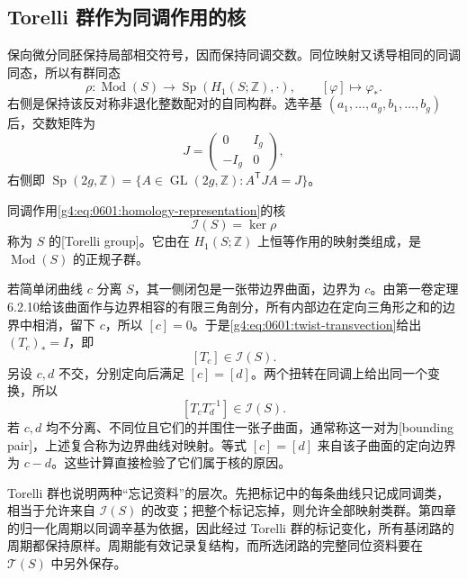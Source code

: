 \subsection{Torelli 群作为同调作用的核}
\label{g4:subsec:0601:06}

保向微分同胚保持局部相交符号，因而保持同调交数。同位映射又诱导相同的同调同态，所以有群同态
\begin{equation}\label{g4:eq:0601:homology-representation}
	\rho:\operatorname{Mod}(S)\longrightarrow
	\operatorname{Sp}(H_1(S;\mathbb Z),\cdot),
	\qquad [\varphi]\longmapsto\varphi_*.
\end{equation}
右侧是保持该反对称非退化整数配对的自同构群。选辛基 \((a_1,\ldots,a_g,b_1,\ldots,b_g)\) 后，交数矩阵为
\[
	J=\begin{pmatrix}0&I_g\\-I_g&0\end{pmatrix},
\]
右侧即 \(\operatorname{Sp}(2g,\mathbb Z)=\{A\in\operatorname{GL}(2g,\mathbb Z):A^{\mathsf T}JA=J\}\)。

\begin{definition}\label{g4:def:0601:torelli}
	同调作用\eqref{g4:eq:0601:homology-representation}的核
	\[
		\mathcal I(S)=\ker\rho
	\]
	称为 \(S\) 的[Torelli group]。它由在 \(H_1(S;\mathbb Z)\) 上恒等作用的映射类组成，是 \(\operatorname{Mod}(S)\) 的正规子群。
\end{definition}

\begin{example}\label{g4:exm:0601:torelli-twists}
	若简单闭曲线 \(c\) 分离 \(S\)，其一侧闭包是一张带边界曲面，边界为 \(c\)。由第一卷定理6.2.10给该曲面作与边界相容的有限三角剖分，所有内部边在定向三角形之和的边界中相消，留下 \(c\)，所以 \([c]=0\)。于是\eqref{g4:eq:0601:twist-transvection}给出 \((T_c)_*=I\)，即
	\[
		[T_c]\in\mathcal I(S).
	\]
	另设 \(c,d\) 不交，分别定向后满足 \([c]=[d]\)。两个扭转在同调上给出同一个变换，所以
	\[
		[T_cT_d^{-1}]\in\mathcal I(S).
	\]
	若 \(c,d\) 均不分离、不同位且它们的并围住一张子曲面，通常称这一对为[bounding pair]，上述复合称为边界曲线对映射。等式 \([c]=[d]\) 来自该子曲面的定向边界为 \(c-d\)。这些计算直接检验了它们属于核的原因。
\end{example}

Torelli 群也说明两种“忘记资料”的层次。先把标记中的每条曲线只记成同调类，相当于允许来自 \(\mathcal I(S)\) 的改变；把整个标记忘掉，则允许全部映射类群。第四章的归一化周期以同调辛基为依据，因此经过 Torelli 群的标记变化，所有基闭路的周期都保持原样。周期能有效记录复结构，而所选闭路的完整同位资料要在 \(\mathcal T(S)\) 中另外保存。


